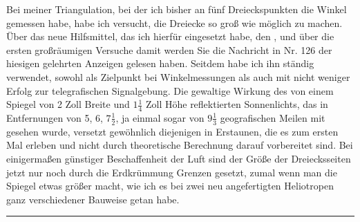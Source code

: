 \par\noindent\hspace*{\parindent}Bei meiner Triangulation, bei der ich bisher an fünf Dreieckspunkten die Winkel gemessen habe, habe ich versucht, die Dreiecke so groß wie möglich zu machen. Über das neue Hilfsmittel, das ich hierfür eingesetzt habe, den , und über die ersten großräumigen Versuche damit werden Sie die Nachricht in Nr. 126 der hiesigen gelehrten Anzeigen gelesen haben. Seitdem habe ich ihn ständig verwendet, sowohl als Zielpunkt bei Winkelmessungen als auch mit nicht weniger Erfolg zur telegrafischen Signalgebung. Die gewaltige Wirkung des von einem Spiegel von 2 Zoll Breite und $1\frac14$ Zoll Höhe reflektierten Sonnenlichts, das in Entfernungen von 5, 6, $7\frac12$, ja einmal sogar von $9\frac13$ geografischen Meilen mit  gesehen wurde, versetzt gewöhnlich diejenigen in Erstaunen, die es zum ersten Mal erleben und nicht durch theoretische Berechnung darauf vorbereitet sind. Bei einigermaßen günstiger Beschaffenheit der Luft sind der Größe der Dreiecksseiten jetzt nur noch durch die Erdkrümmung Grenzen gesetzt, zumal wenn man die Spiegel etwas größer macht, wie ich es bei zwei neu angefertigten Heliotropen ganz verschiedener Bauweise getan habe.
\begin{center}\rule{3.5cm}{.4pt}\end{center}

